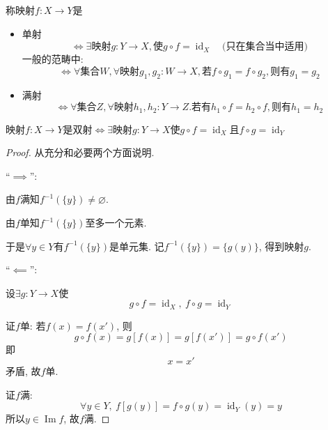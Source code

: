\begin{definition}
    称映射$f\colon X\to Y$是
    \begin{itemize}
        \item 单射
        \begin{equation}
          \iff \exists \text{映射}g \colon Y \to  X, \text{使} g\circ f = \operatorname{id}_{X} \quad \text{(只在集合当中适用)}
        \end{equation}
        一般的范畴中:
        \begin{equation}
          \iff \forall \text{集合}W, \forall \text{映射} g_1, g_2 \colon W \to X ,\text{若} f \circ g_1 = f\circ g_2, \text{则有} g_1=g_2
        \end{equation}

        \item 满射
        \begin{equation}
          \iff\forall \text{集合}Z , \forall \text{映射}h_1,h_2 \colon Y\to Z .
          \text{若有}h_1\circ f = h_2 \circ f , \text{则有}h_1=h_2
        \end{equation}
    \end{itemize}
\end{definition}


\begin{theorem}
    映射$f\colon X\to Y$是双射$\iff$$\exists \text{映射}g\colon Y\to X \text{使}g\circ f =\operatorname{id}_X \text{且} f\circ g = \operatorname{id}_Y$
\end{theorem}
\begin{proof}从充分和必要两个方面说明.

    ``$\implies$'':

    由$f$满知$f^{-1}(\{y\})\neq  \varnothing$.

    由$f$单知$f^{-1}(\{y\})$至多一个元素.

    于是$\forall y\in Y$有$f^{-1}(\{y\})$是单元集. 记$f^{-1}(\{y\}) = \{g(y)\}$, 得到映射$g$.

    ``$\impliedby$'':
    
    设$\exists g\colon Y\to X$使
    \begin{equation}
      g\circ f = \operatorname{id}_X, 
      \ f\circ g= \operatorname{id}_Y
    \end{equation}

    证$f$单:
    若$f(x) = f(x')$, 则
    \begin{equation}
      g\circ f(x) = g[f(x)] = g[f(x')] = g\circ f(x')
    \end{equation}
    即
    \begin{equation}
      x=x'
    \end{equation}
    矛盾, 故$f$单.

    证$f$满:
    \begin{equation}
      \forall y\in Y, \ f[g(y)] = f\circ g(y) = \operatorname{id}_Y (y) = y
    \end{equation}
    所以$y\in \operatorname{Im} f$, 故$f$满.

\end{proof}


